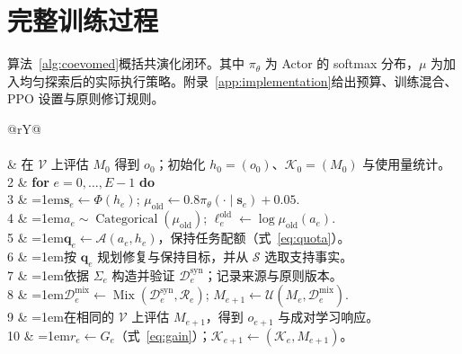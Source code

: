 \clearpage
\section{完整训练过程}
\label{app:algorithm}

算法~\ref{alg:coevomed}概括共演化闭环。其中 $\pi_\theta$ 为 Actor 的 softmax 分布，$\mu$ 为加入均匀探索后的实际执行策略。附录~\ref{app:implementation}给出预算、训练混合、PPO 设置与原则修订规则。

\begin{algorithm}[H]
\small
\setlength{\tabcolsep}{4pt}
\renewcommand{\arraystretch}{1.08}
\begin{tabularx}{\linewidth}{@{}rY@{}}
\toprule
{}\\
\\
 & 在 $\mathcal V$ 上评估 $M_0$ 得到 $o_0$；初始化 $h_0=(o_0)$、$\mathcal K_0=(M_0)$ 与使用量统计。\\
2 & \textbf{for} $e=0,\ldots,E-1$ \textbf{do}\\
3 & \hangindent=1em\quad $\mathbf{s}_e\leftarrow\Phi(h_e)$; $\mu_{\mathrm{old}}\leftarrow0.8\pi_\theta(\cdot\mid\mathbf{s}_e)+0.05$.\\
4 & \hangindent=1em\quad $a_e\sim\operatorname{Categorical}(\mu_{\mathrm{old}})$; $\ell_e^{\mathrm{old}}\leftarrow\log\mu_{\mathrm{old}}(a_e)$.\\
5 & \hangindent=1em\quad $\boldsymbol q_e\leftarrow\mathcal A(a_e,h_e)$，保持任务配额（式~\ref{eq:quota}）。\\
6 & \hangindent=1em\quad 按 $\boldsymbol q_e$ 规划修复与保持目标，并从 $\mathcal S$ 选取支持事实。\\
7 & \hangindent=1em\quad 依据 $\Sigma_e$ 构造并验证 $\mathcal D_e^{\mathrm{syn}}$；记录来源与原则版本。\\
8 & \hangindent=1em\quad $\mathcal D_e^{\mathrm{mix}}\leftarrow\operatorname{Mix}(\mathcal D_e^{\mathrm{syn}},\mathcal R_e)$; $M_{e+1}\leftarrow\mathcal U(M_e,\mathcal D_e^{\mathrm{mix}})$.\\
9 & \hangindent=1em\quad 在相同的 $\mathcal V$ 上评估 $M_{e+1}$，得到 $o_{e+1}$ 与成对学习响应。\\
10 & \hangindent=1em\quad $r_e\leftarrow G_e$（式~\ref{eq:gain}）；$\mathcal K_{e+1}\leftarrow(\mathcal K_e,M_{e+1})$。\\

\end{tabularx}
\end{algorithm}
